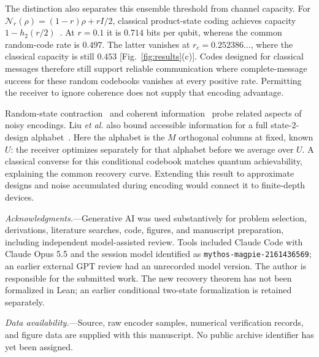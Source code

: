 \documentclass[aps,prl,reprint,superscriptaddress,amsmath,amssymb]{revtex4-2}
\newcommand{\N}{\mathcal N}
\begin{document}
The distinction also separates this ensemble threshold from channel
capacity. For $\N_r(\rho)=(1-r)\rho+rI/2$, classical product-state coding
achieves capacity $1-h_2(r/2)$~\cite{King}. At $r=0.1$ it is $0.714$ bits
per qubit, whereas the common random-code rate is $0.497$. The latter
vanishes at $r_c=0.252386\ldots$, where the classical capacity is still
$0.453$ [Fig.~\ref{fig:results}(c)]. Codes designed for classical messages
therefore still support reliable communication where complete-message
success for these random codebooks vanishes at every positive rate.
Permitting the receiver to ignore coherence does not supply that encoding
advantage.

Random-state contraction~\cite{Ibarrondo} and coherent
information~\cite{Sommers} probe related aspects of noisy encodings.
Liu \emph{et al.} also bound accessible information for a full state-2-design
alphabet~\cite{Liu}. Here the alphabet is the $M$ orthogonal columns at
fixed, known $U$: the receiver optimizes separately for that alphabet before
we average over $U$. A classical converse for this conditional codebook
matches quantum achievability, explaining the common recovery curve.
Extending this result to approximate designs and noise accumulated during
encoding would connect it to finite-depth devices.

\emph{Acknowledgments.}---Generative AI was used substantively for problem
selection, derivations, literature searches, code, figures, and manuscript
preparation, including independent model-assisted review. Tools included
Claude Code with Claude Opus 5.5 and the session model identified as
\texttt{mythos-magpie-2161436569}; an earlier external GPT review had an
unrecorded model version. The author is responsible for the submitted work.
The new recovery theorem has not been formalized in Lean; an earlier
conditional two-state formalization is retained separately.

\emph{Data availability.}---Source, raw encoder samples, numerical verification
records, and figure data are supplied with this manuscript. No public archive
identifier has yet been assigned.
\end{document}
